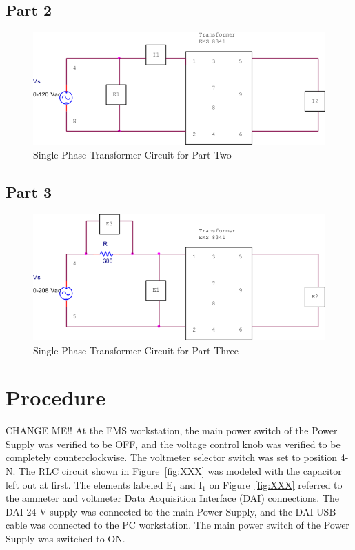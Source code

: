 \documentclass{article}
\begin{document}
\subsection*{Part 2}
\begin{figure}[h]
  \centering
  \includegraphics[width=.8\textwidth]{circuit_02}
  \caption{Single Phase Transformer Circuit for Part Two}
  \label{fig:circuit_02}
\end{figure}

\subsection*{Part 3}
\begin{figure}[h]
  \centering
  \includegraphics[width=.8\textwidth]{circuit_03}
  \caption{Single Phase Transformer Circuit for Part Three}
  \label{fig:circuit_03}
\end{figure}

\section{Procedure}
CHANGE ME!! At the EMS workstation, the main power switch of the Power Supply
was verified to be OFF, and the voltage control knob was verified to be
completely counterclockwise. The voltmeter selector switch was set to position
4-N. The RLC circuit shown in Figure~\ref{fig:XXX} was modeled with the
capacitor left out at first. The elements labeled E$_1$ and I$_1$ on
Figure~\ref{fig:XXX} referred to the ammeter and voltmeter Data Acquisition
Interface (DAI) connections. The DAI 24-V supply was connected to the main
Power Supply, and the DAI USB cable was connected to the PC workstation. The
main power switch of the Power Supply was switched to ON.
\end{document}
